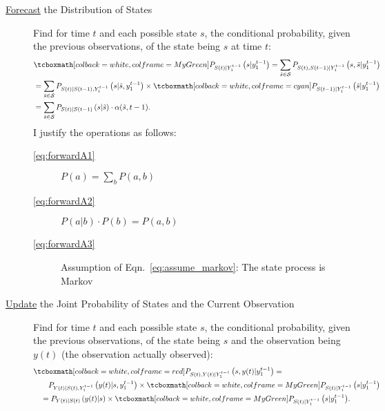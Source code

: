 \documentclass[]{article}
\newcommand{\ts}[3]{#1_{#2}^{#3}}                    %
\newcommand{\ti}[2]{{#1}{(#2)}}                  %
\newcommand{\states}{{\cal{S}}}
\begin{document}
\begin{description}
\item[\underline{Forecast} the Distribution of States] Find for time $t$ and each
  possible state $s$, the conditional probability, given the
  previous observations, of the state being $s$ at time $t$:
  \begin{subequations}\label{eq:forwardA}
    \begin{align}
      \label{eq:forwardA1}
      &\prealpha = \sum_{{\tilde s}\in\states}
      P_{\ti{S}{t},\ti{S}{t-1}|\ts{Y}{1}{t-1}} \left( s, {\tilde s}
      |\ts{y}{1}{t-1} \right)\\
      \label{eq:forwardA2}
      & = \sum_{{\tilde s}\in\states}
        P_{\ti{S}{t}|\ti{S}{t-1},\ts{Y}{1}{t-1}}
        \left( s|{\tilde s},\ts{y}{1}{t-1} \right) \times
       \alphax{t-1}{{\tilde s}} \\
      \label{eq:forwardA3}
      & = \sum_{{\tilde s}\in\states} P_{\ti{S}{t}|\ti{S}{t-1}} \left( s|{\tilde s} \right)
      \cdot \alpha({\tilde s},t-1) .
    \end{align}
  \end{subequations}
  I justify the operations as follows:
  \begin{description}
  \item[\eqref{eq:forwardA1}] $P(a) = \sum_b P(a,b)$
  \item[\eqref{eq:forwardA2}] $P(a|b)\cdot P(b) = P(a,b)$
  \item[\eqref{eq:forwardA3}] Assumption of
    Eqn.~\eqref{eq:assume_markov}: The state process is Markov
  \end{description}
\item[\underline{Update} the Joint Probability of States and the Current
  Observation] Find for time $t$ and each possible state $s$, the
  conditional probability, given the previous observations, of the
  state being $s$ and the observation being $\ti{y}{t}$ (the observation
  actually observed):
  \begin{subequations}\label{eq:forwardB}
    \begin{align}
      & \pregamma = \nonumber \\
      \label{eq:forwardB1}
      &\quad \quad P_{\ti{Y}{t} |
        \ti{S}{t},\ts{Y}{1}{t-1}}\left(\ti{y}{t} |s, \ts{y}{1}{t-1}
      \right) \times \prealpha\\
      \label{eq:forwardB2}
      & \quad = P_{\ti{Y}{t} | \ti{S}{t}}\left(\ti{y}{t} |s \right) \times
      \prealpha .
    \end{align}

\end{subequations}
\end{description}
\end{document}
